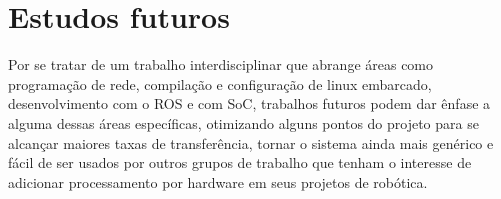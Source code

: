 \chapter{Estudos futuros}\label{cap:trabfut}

Por se tratar de um trabalho interdisciplinar que abrange áreas como programação de rede, compilação e configuração de linux embarcado, desenvolvimento com o ROS e com SoC, trabalhos futuros podem dar ênfase a alguma dessas áreas específicas, otimizando alguns pontos do projeto para se alcançar maiores taxas de transferência, tornar o sistema ainda mais genérico e fácil de ser usados por outros grupos de trabalho que tenham o interesse de adicionar processamento por hardware em seus projetos de robótica.